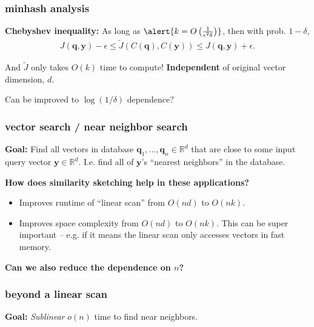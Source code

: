 \documentclass[compress]{beamer}
\newcommand{\bv}[1]{\mathbf{#1}}
\newcommand{\R}{\mathbb{R}}
\begin{document}
\begin{frame}
	\frametitle{minhash analysis}
	\textbf{Chebyshev inequality:} As long as $\alert{{k = O\left(\frac{1}{\epsilon^2\delta}\right)}}$, then with prob. $1-\delta$,
	\begin{align*}
		J(\bv{q}, \bv{y}) -\epsilon \leq \tilde{J}\left(C(\bv{q}),C(\bv{y})\right)   \leq J(\bv{q}, \bv{y}) + \epsilon. 
	\end{align*}
	\begin{center}
		And $\tilde{J}$ only takes $O(k)$ time to compute! \alert{\textbf{Independent}} of original vector dimension, $d$.
	\end{center}	
	
	Can be improved to $\log(1/\delta)$ dependence?
\end{frame}



\begin{frame}
	\frametitle{vector search / near neighbor search}
	\textbf{Goal:} Find all vectors in database $\bv{q}_1, \ldots, \bv{q}_n \in \R^d$ that are close to some input query vector $\bv{y}\in \R^d$. I.e. find all of $\bv{y}$'s ``nearest neighbors'' in the database.

		\begin{center}
	\textbf{\alert{How does similarity sketching help in these applications?}}
		\end{center}
	\begin{itemize}
		\item Improves runtime of ``linear scan'' from $O(nd)$ to $O(nk)$.
		\item Improves space complexity from $O(nd)$ to $O(nk)$. This can be super important -- e.g. if it means the linear scan only accesses vectors in fast memory.
	\end{itemize}

	\begin{center}
		\textbf{Can we also reduce the dependence on $n$?}
	\end{center}
\end{frame}

\begin{frame}
	\frametitle{beyond a linear scan}
	\begin{center}
		\textbf{Goal:} \emph{Sublinear} $o(n)$ time to find near neighbors. 
	\end{center}
\end{frame}
\end{document}
